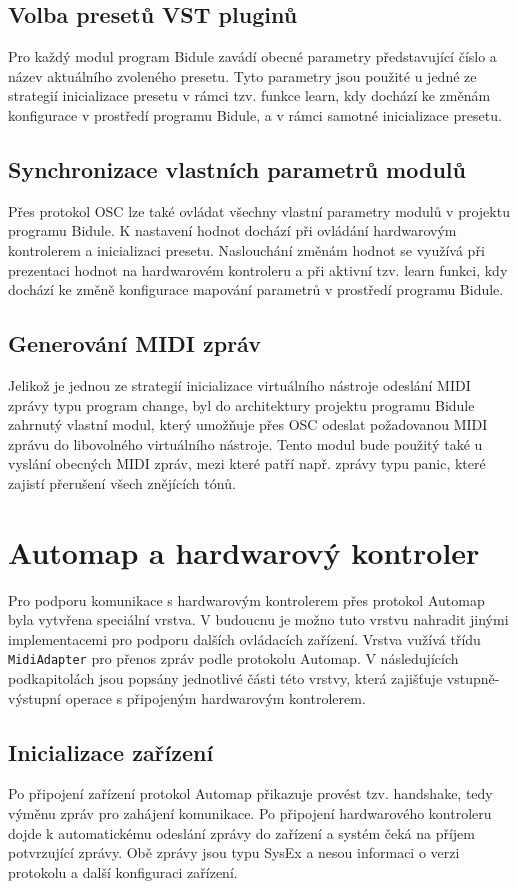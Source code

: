 \documentclass[thesis=M,czech]{FITthesis}[2019/03/06]
\begin{document}
	\subsection{Volba presetů VST pluginů}
	Pro každý modul program Bidule zavádí obecné parametry představující číslo a název aktuálního zvoleného presetu.
	Tyto parametry jsou použité u jedné ze strategií inicializace presetu v rámci tzv. funkce learn, kdy dochází
	ke změnám konfigurace v prostředí programu Bidule, a v rámci samotné inicializace presetu.
	
	\subsection{Synchronizace vlastních parametrů modulů}
	Přes protokol OSC lze také ovládat všechny vlastní parametry modulů v projektu programu Bidule.
	K nastavení hodnot dochází při ovládání hardwarovým kontrolerem a inicializaci presetu.
	Naslouchání změnám hodnot se využívá při prezentaci hodnot na hardwarovém kontroleru
	a při aktivní tzv. learn funkci, kdy dochází ke změně konfigurace mapování parametrů v prostředí programu Bidule.
	
	\subsection{Generování MIDI zpráv}
	Jelikož je jednou ze strategií inicializace virtuálního nástroje odeslání MIDI zprávy typu program change,
	byl do architektury projektu programu Bidule zahrnutý vlastní modul, který umožňuje přes OSC odeslat požadovanou MIDI zprávu
	do libovolného virtuálního nástroje. Tento modul bude použitý také u vyslání obecných MIDI zpráv,
	mezi které patří např. zprávy typu panic, které zajistí přerušení všech znějících tónů.
	
	\section{Automap a hardwarový kontroler}
	Pro podporu komunikace s hardwarovým kontrolerem přes protokol Automap byla vytvřena speciální vrstva.
	V budoucnu je možno tuto vrstvu nahradit jinými implementacemi pro podporu dalších ovládacích zařízení.
	Vrstva vužívá třídu \texttt{MidiAdapter} pro přenos zpráv podle protokolu Automap.
	V následujících podkapitolách jsou popsány jednotlivé části této vrstvy, která zajišťuje
	vstupně-výstupní operace s připojeným hardwarovým kontrolerem. 
	
	\subsection{Inicializace zařízení}
	Po připojení zařízení protokol Automap přikazuje provést tzv. handshake, tedy výměnu zpráv
	pro zahájení komunikace. Po připojení hardwarového kontroleru dojde k automatickému odeslání zprávy do zařízení
	a systém čeká na příjem potvrzující zprávy. 
	Obě zprávy jsou typu SysEx a nesou informaci o verzi protokolu a další konfiguraci zařízení.
	
\end{document}
